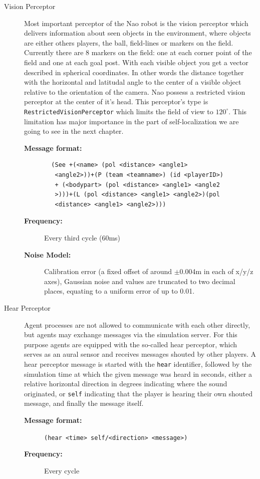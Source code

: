 \begin{description}
  \item [Vision Perceptor]
  Most important perceptor of the Nao robot is the vision perceptor which delivers information about seen objects in the environment, where objects are either others players, the ball, field-lines or markers on the field. Currently there are 8 markers on the field: one at each corner point of the field and one at each goal post. With each visible object you get a vector described in spherical coordinates. In other words the distance together with the horizontal and latitudal angle to the center of a visible object relative to the orientation of the camera. Nao possess a restricted vision perceptor at the center of it's head. This perceptor's type is \texttt{RestrictedVisionPerceptor} which limits the field of view to $120^{\circ}$. This limitation has major importance in the part of self-localization we are going to see in the next chapter.

 \begin{description}
  \item[{\bf Message format:}]
  \begin{verbatim}
  (See +(<name> (pol <distance> <angle1>
   <angle2>))+(P (team <teamname>) (id <playerID>)
   + (<bodypart> (pol <distance> <angle1> <angle2
   >)))+(L (pol <distance> <angle1> <angle2>)(pol
   <distance> <angle1> <angle2>)))
  \end{verbatim}
  \item[{\bf Frequency:}]
 Every third cycle (60ms)
  \item[{\bf Noise Model:}]Calibration error (a fixed offset of around $\pm$0.004m in each of x/y/z axes), Gaussian noise  and values are truncated to two decimal places, equating to a uniform error of up to 0.01.
  \end{description}


  \item [Hear Perceptor]
  Agent processes are not allowed to communicate with each other directly, but agents may exchange messages via the simulation server. For this purpose agents are equipped with the so-called hear perceptor, which serves as an aural sensor and receives messages shouted by other players. A hear perceptor message is started with the \texttt{hear} identifier, followed by the simulation time at which the given message was heard in seconds, either a relative horizontal direction in degrees indicating where the sound originated, or \texttt{self} indicating that the player is hearing their own shouted message, and finally the message itself.
  \begin{description}
  \item[{\bf Message format:}]
  \texttt{(hear <time> self/<direction> <message>)}
  \item[{\bf Frequency:}]
  Every cycle
  \end{description}


\end{description}
